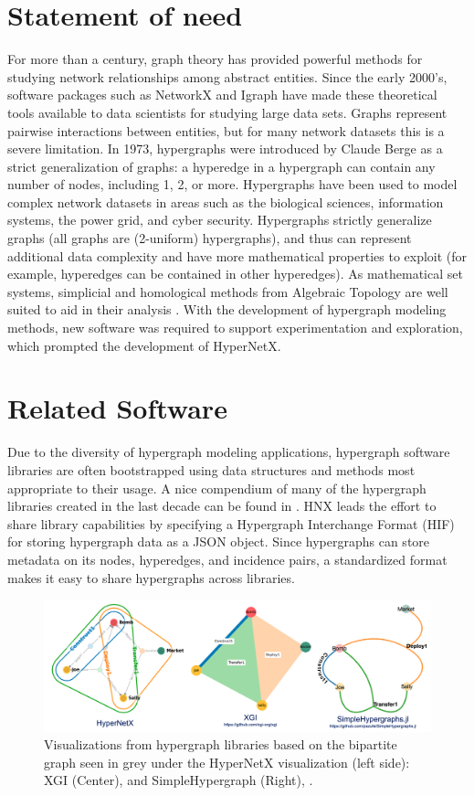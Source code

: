 \documentclass{article}
\begin{document}
\section{Statement of need}
For more than a century, graph theory has provided powerful methods for studying network relationships among abstract entities.
Since the early 2000's, software packages such as NetworkX \cite{hagberg2020}and Igraph \cite{csardi2006} have
made these theoretical tools available to data scientists for studying large data sets.
Graphs represent pairwise interactions between entities, but for many network datasets this is a severe limitation.
In 1973, hypergraphs were introduced by Claude Berge \cite{Berge1973Graphs}as a strict generalization of graphs: a hyperedge in a hypergraph can contain any number of nodes, including 1, 2, or more.
Hypergraphs have been used to model complex network datasets in
areas such as the biological sciences, information systems, the power grid, and cyber security.
Hypergraphs strictly generalize graphs (all graphs are (2-uniform) hypergraphs), and thus can represent additional data complexity and have more mathematical properties to exploit (for example, hyperedges can be contained in other hyperedges). As mathematical set systems, simplicial and homological methods from
Algebraic Topology are well suited to aid in their analysis \cite{Joslyn2021,Torres2021}.
With the development of hypergraph modeling methods, new software was required to support
experimentation and exploration, which prompted the development of HyperNetX.

\section{Related Software}
Due to the diversity of hypergraph modeling applications, hypergraph software libraries are 
often bootstrapped using data structures and methods most appropriate to their usage. 
A nice compendium of many of the hypergraph libraries created in the last decade can be found in \cite{Kurte2021}.
HNX leads the effort to share library capabilities by specifying a Hypergraph Interchange Format (HIF) 
for storing hypergraph data as a JSON object. Since hypergraphs can store metadata on its nodes, 
hyperedges, and incidence pairs, a standardized format makes it easy to share hypergraphs across libraries.

\begin{figure}[h!]
    \centering
    \includegraphics[]{Figures/3graphs.png}
    \caption{Visualizations from hypergraph libraries based on the bipartite graph seen in grey
    under the HyperNetX visualization (left side): XGI (Center), \cite{Landry2023} and SimpleHypergraph (Right), \cite{Szufel2019}.}
    \label{fig:3graphs}
    \end{figure}
  
\end{document}
